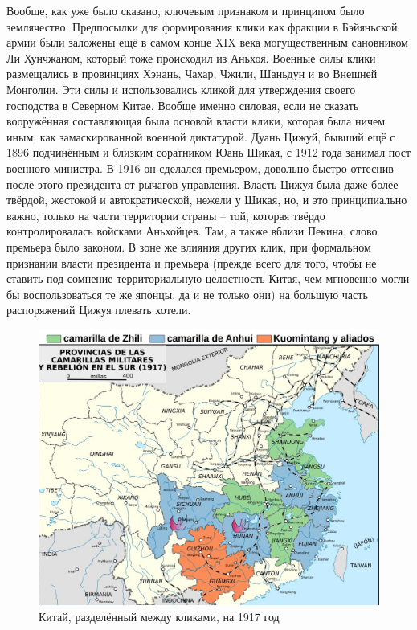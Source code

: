 Вообще, как уже было сказано, ключевым признаком и принципом было землячество. Предпосылки для формирования клики как фракции в Бэйяньской армии были заложены ещё в самом конце XIX века могущественным сановником Ли Хунчжаном, который тоже происходил из Аньхоя. Военные силы клики размещались в провинциях Хэнань, Чахар, Чжили, Шаньдун и во Внешней Монголии. Эти силы и использовались кликой для утверждения своего господства в Северном Китае. Вообще именно силовая, если не сказать вооружённая составляющая была основой власти клики, которая была ничем иным, как замаскированной военной диктатурой. Дуань Цижуй, бывший ещё с 1896 подчинённым и близким соратником Юань Шикая, с 1912 года занимал пост военного министра. В 1916 он сделался премьером, довольно быстро оттеснив после этого президента от рычагов управления. Власть Цижуя была даже более твёрдой, жестокой и автократической, нежели у Шикая, но, и это принципиально важно, только на части территории страны – той, которая твёрдо контролировалась войсками Аньхойцев. Там, а также вблизи Пекина, слово премьера было законом. В зоне же влияния других клик, при формальном признании власти президента и премьера (прежде всего для того, чтобы не ставить под сомнение территориальную целостность Китая, чем мгновенно могли бы воспользоваться те же японцы, да и не только они) на большую часть распоряжений Цижуя плевать хотели. 

\begin{figure}[h!tb] 
	\centering\includegraphics[scale=0.4]{Glava4/Z1CcQ3h0vFA.jpg}
	\caption{Китай, разделённый между кликами, на 1917 год}%
\end{figure}

